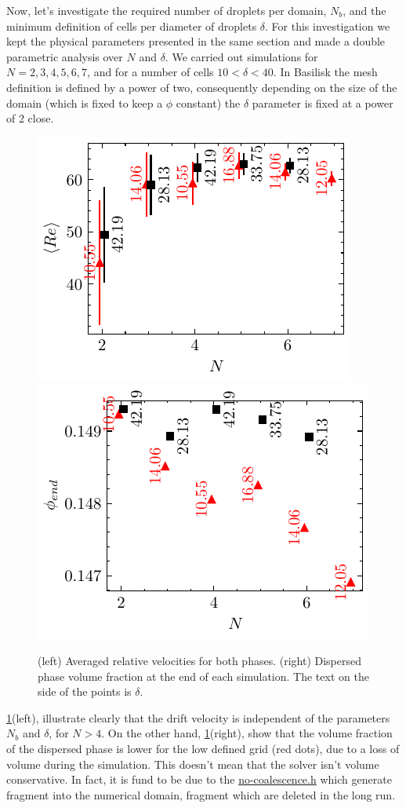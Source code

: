 Now, let's investigate the required number of droplets per domain, $N_b$, and the minimum definition of cells per diameter of droplets $\delta$.  
For this investigation we kept the physical parameters presented in the same section and made a double parametric analysis over $N$ and $\delta$. 
We carried out simulations for $N = 2, 3, 4, 5, 6, 7$, and for a number of cells $10 <\delta < 40$. 
In Basilisk the mesh definition is defined by a power of two, consequently depending on the size of the domain (which is fixed to keep a $\phi$ constant) the $\delta$ parameter is fixed at a power of 2 close. 
\begin{figure}[h!]
    \centering
    \includegraphics[height= 0.3\textwidth]{image/VALIDATION/N_and_delta/DUd.pdf}
    \includegraphics[height= 0.3\textwidth]{image/VALIDATION/N_and_delta/PHI.pdf}
    \caption{(left) Averaged relative velocities for both phases.
            (right) Dispersed phase volume fraction at the end of each simulation.
            The text on the side of the points is $\delta$. }
    \label{fig:VALIDATION_Nd_1}
\end{figure}
\ref{fig:VALIDATION_Nd_1}(left), illustrate clearly that the drift velocity is independent of the parameters $N_b$ and $\delta$, for $N >4$. 
On the other hand, \ref{fig:VALIDATION_Nd_1}(right), show that the volume fraction of the dispersed phase is lower for the low defined grid (red dots), due to a loss of volume during the simulation.
This doesn't mean that the solver isn't volume conservative. 
In fact, it is fund to be due to the \href{http://basilisk.fr/sandbox/fintzin/Rising-Suspension/no-coalescence.h}{no-coalescence.h} which generate fragment into the numerical domain, fragment which are deleted in the long run. 
